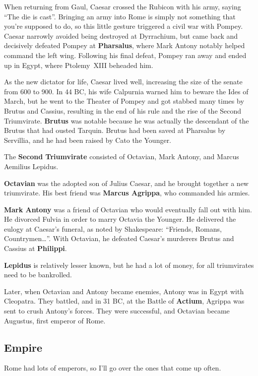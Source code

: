 When returning from Gaul, Caesar crossed the Rubicon with his army, saying ``The die is cast''.
Bringing an army into Rome is simply not something that you're supposed to do,
so this little gesture triggered a civil war with Pompey.
Caesar narrowly avoided being destroyed at Dyrrachium,
but came back and decisively defeated Pompey at \textbf{Pharsalus},
where Mark Antony notably helped command the left wing.
Following his final defeat, Pompey ran away and ended up in Egypt, where Ptolemy~XIII beheaded him.

As the new dictator for life, Caesar lived well, increasing the size of the senate from 600 to 900.
In 44 BC, his wife Calpurnia warned him to beware the Ides of March,
but he went to the Theater of Pompey and got stabbed many times by Brutus and Cassius,
resulting in the end of his rule and the rise of the Second Triumvirate.
\textbf{Brutus} was notable
because he was actually the descendant of the Brutus that had ousted Tarquin.
Brutus had been saved at Pharsalus by Servillia, and he had been raised by Cato the Younger.

The \textbf{Second Triumvirate} consisted of Octavian, Mark Antony, and Marcus Aemilius Lepidus.

\textbf{Octavian} was the adopted son of Julius Caesar, and he brought together a new triumvirate.
His best friend was \textbf{Marcus Agrippa}, who commanded his armies.

\textbf{Mark Antony} was a friend of Octavian who would eventually fall out with him.
He divorced Fulvia in order to marry Octavia the Younger.
He delivered the eulogy at Caesar's funeral, as noted by Shakespeare:
``Friends, Romans, Countrymen\ldots{}''.
With Octavian, he defeated Caesar's murderers Brutus and Cassius at \textbf{Philippi}.

\textbf{Lepidus} is relatively lesser known, but he had a lot of money,
for all triumvirates need to be bankrolled.

Later, when Octavian and Antony became enemies, Antony was in Egypt with Cleopatra.
They battled, and in 31 BC, at the Battle of \textbf{Actium},
Agrippa was sent to crush Antony's forces.
They were successful, and Octavian became Augustus, first emperor of Rome.

\subsection*{Empire}

Rome had lots of emperors, so I'll go over the ones that come up often.

